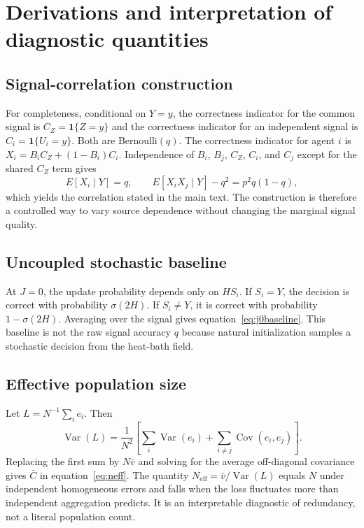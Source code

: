 \documentclass[11pt,a4paper]{article}
\begin{document}
\section{Derivations and interpretation of diagnostic quantities}

\subsection{Signal-correlation construction}

For completeness, conditional on $Y=y$, the correctness indicator for the common signal is $C_Z=\mathbf{1}\{Z=y\}$ and the correctness indicator for an independent signal is $C_i=\mathbf{1}\{U_i=y\}$. Both are Bernoulli$(q)$. The correctness indicator for agent $i$ is $X_i=B_iC_Z+(1-B_i)C_i$. Independence of $B_i$, $B_j$, $C_Z$, $C_i$, and $C_j$ except for the shared $C_Z$ term gives
\[
E[X_i\mid Y]=q,
\qquad
E[X_iX_j\mid Y]-q^2=p^2q(1-q),
\]
which yields the correlation stated in the main text. The construction is therefore a controlled way to vary source dependence without changing the marginal signal quality.

\subsection{Uncoupled stochastic baseline}

At $J=0$, the update probability depends only on $HS_i$. If $S_i=Y$, the decision is correct with probability $\sigma(2H)$. If $S_i\ne Y$, it is correct with probability $1-\sigma(2H)$. Averaging over the signal gives equation~\ref{eq:j0baseline}. This baseline is not the raw signal accuracy $q$ because natural initialization samples a stochastic decision from the heat-bath field.

\subsection{Effective population size}

Let $L=N^{-1}\sum_i e_i$. Then
\[
\operatorname{Var}(L)=\frac{1}{N^2}\left[\sum_i\operatorname{Var}(e_i)+\sum_{i\ne j}\operatorname{Cov}(e_i,e_j)\right].
\]
Replacing the first sum by $N\bar v$ and solving for the average off-diagonal covariance gives $\bar C$ in equation~\ref{eq:neff}. The quantity $N_{\mathrm{eff}}=\bar v/\operatorname{Var}(L)$ equals $N$ under independent homogeneous errors and falls when the loss fluctuates more than independent aggregation predicts. It is an interpretable diagnostic of redundancy, not a literal population count.
\end{document}
